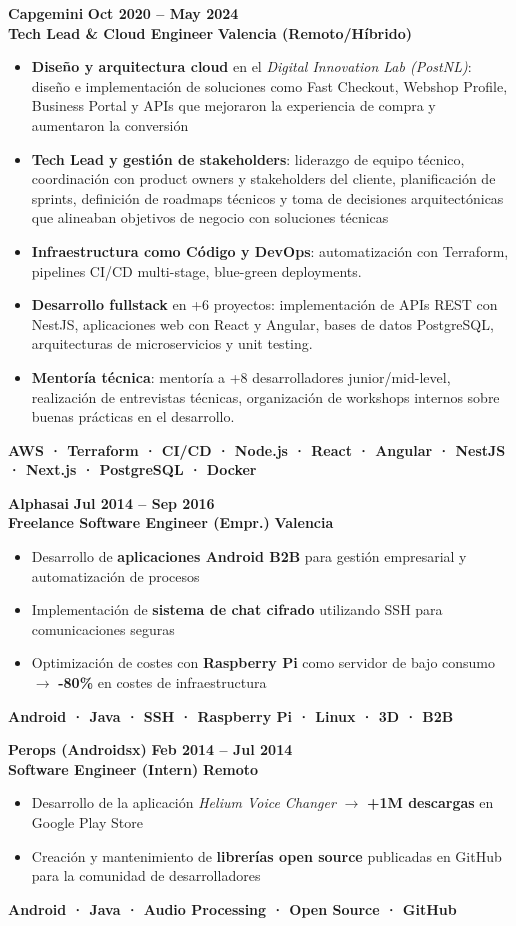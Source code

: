 \documentclass[11pt,a4paper]{article}
\newcommand{\experience}[4]{
    \textbf{\large\color{company}#1} \hfill \textbf{\color{date}#2}\\
    \textbf{\color{role}#3} \hfill \textbf{\color{date}#4}\\
    \vspace{0.3em}
}
\newcommand{\badges}[1]{
    \vspace{0.1em}
    \begin{center}
        \small\bfseries\color{accent}#1
    \end{center}
    \vspace{0.1em}
}
\newcommand{\achievement}[1]{
    \item #1
}
\begin{document}
\vspace{0.5em}
\experience{Capgemini}{Oct 2020 -- May 2024}{Tech Lead \& Cloud Engineer}{Valencia (Remoto/Híbrido)}
\begin{itemize}[leftmargin=1em, itemsep=0.2em]
    \achievement{\textbf{Diseño y arquitectura cloud} en el \textit{Digital Innovation Lab (PostNL)}: diseño e implementación de soluciones como Fast Checkout, Webshop Profile, Business Portal y APIs que mejoraron la experiencia de compra y aumentaron la conversión}
    \achievement{\textbf{Tech Lead y gestión de stakeholders}: liderazgo de equipo técnico, coordinación con product owners y stakeholders del cliente, planificación de sprints, definición de roadmaps técnicos y toma de decisiones arquitectónicas que alineaban objetivos de negocio con soluciones técnicas}
    \achievement{\textbf{Infraestructura como Código y DevOps}: automatización con Terraform, pipelines CI/CD multi-stage, blue-green deployments.}
    \achievement{\textbf{Desarrollo fullstack} en +6 proyectos: implementación de APIs REST con NestJS, aplicaciones web con React y Angular, bases de datos PostgreSQL, arquitecturas de microservicios y unit testing.}
    \achievement{\textbf{Mentoría técnica}: mentoría a +8 desarrolladores junior/mid-level, realización de entrevistas técnicas, organización de workshops internos sobre buenas prácticas en el desarrollo.}
\end{itemize}
\badges{AWS · Terraform · CI/CD · Node.js · React · Angular · NestJS · Next.js · PostgreSQL · Docker}

\vspace{0.3em}
\experience{Alphasai}{Jul 2014 -- Sep 2016}{Freelance Software Engineer (Empr.)}{Valencia}
\begin{itemize}[leftmargin=1em, itemsep=0.2em]
    \achievement{Desarrollo de \textbf{aplicaciones Android B2B} para gestión empresarial y automatización de procesos}
    \achievement{Implementación de \textbf{sistema de chat cifrado} utilizando SSH para comunicaciones seguras}
    \achievement{Optimización de costes con \textbf{Raspberry Pi} como servidor de bajo consumo $\rightarrow$ \textbf{-80\%} en costes de infraestructura}
\end{itemize}
\badges{Android · Java · SSH · Raspberry Pi · Linux · 3D · B2B}

\vspace{0.3em}
\experience{Perops (Androidsx)}{Feb 2014 -- Jul 2014}{Software Engineer (Intern)}{Remoto}
\vspace{0.1em}
\begin{itemize}[leftmargin=1em, itemsep=0.2em]
    \achievement{Desarrollo de la aplicación \textit{Helium Voice Changer} $\rightarrow$ \textbf{+1M descargas} en Google Play Store}
    \achievement{Creación y mantenimiento de \textbf{librerías open source} publicadas en GitHub para la comunidad de desarrolladores}
\end{itemize}
\badges{Android · Java · Audio Processing · Open Source · GitHub}
\end{document}
